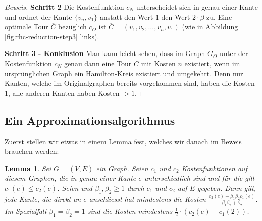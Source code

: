 \documentclass[a4paper,11pt]{scrreprt}
\begin{document}
\begin{proof}[Beweis]
\textbf{Schritt 2} Die Kostenfunktion $c_N$ unterscheidet sich in genau einer Kante und ordnet der Kante $\{v_n, v_1\}$ anstatt den Wert $1$ den Wert $2 \cdot \beta$ zu. Eine optimale Tour $\overline{C}$ bezüglich $c_O$ ist $\overline{C} = (v_1, v_2, \dots, v_n, v_1)$ (wie in Abbildung \ref{fig:rhc-reduction-step3} links).

\textbf{Schritt 3 - Konklusion} Man kann leicht sehen, dass im Graph $G_O$ unter der Kostenfunktion $c_N$ genau dann eine Tour $C$ mit Kosten $n$ existiert, wenn im ursprünglichen Graph ein Hamilton-Kreis existiert und umgekehrt. Denn nur Kanten, welche im Originalgraphen bereits vorgekommen sind, haben die Kosten 1, alle anderen Kanten haben Kosten $> 1$. 
\end{proof}

\subsection{Ein Approximationsalgorithmus}

Zuerst stellen wir etwas in einem Lemma fest, welches wir danach im Beweis brauchen werden:

\newtheorem{lemma1}{Lemma}

\begin{lemma1}
Sei $G = (V, E)$ ein Graph. Seien $c_1$ und $c_2$ Kostenfunktionen auf diesem Graphen, die in genau einer Kante $e$ unterschiedlich sind und für die gilt $c_1(e) \le c_2(e)$. Seien und $\beta_1, \beta_2 \ge 1$ durch $c_1$ und $c_2$ auf $E$ gegeben. Dann gilt, jede Kante, die direkt an $e$ anschliesst hat mindestens die Kosten $\frac{c_2(e) - \beta_1\beta_2 c_1(e)}{\beta_1\beta_2 + \beta_2}$. Im Spezialfall $\beta_1 = \beta_2 = 1$ sind die Kosten mindestens $\frac{1}{2} \cdot (c_2(e) - c_1(2))$.
\end{lemma1}
\end{document}
